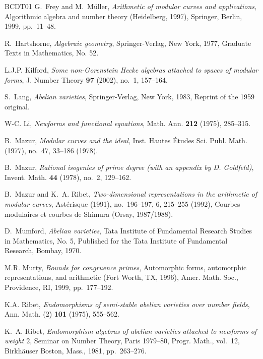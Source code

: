 \documentclass[10pt,twoside]{article}
\theoremstyle{definition}
\begin{document}
\begin{thebibliography}{BCDT01}
G.~Frey and M.~M{\"u}ller, \emph{Arithmetic of modular curves and
  applications}, Algorithmic algebra and number theory (Heidelberg, 1997),
  Springer, Berlin, 1999, pp.~11--48.

R.~Hartshorne, \emph{Algebraic geometry}, Springer-Verlag, New York, 1977,
  Graduate Texts in Mathematics, No. 52. 

L.\thinspace{}J.\thinspace{}P. Kilford, 
  \emph{Some non-{G}orenstein {H}ecke algebras attached to
  spaces of modular forms}, J. Number Theory \textbf{97} (2002), no.~1,
  157--164. 

S.~Lang, \emph{Abelian varieties}, Springer-Verlag, New York, 1983, Reprint
  of the 1959 original. 


W-C. Li, \emph{Newforms and functional equations}, Math. Ann. \textbf{212}
  (1975), 285--315.

B.~Mazur, \emph{Modular curves and the  ideal}, Inst.
  Hautes \'Etudes Sci. Publ. Math. (1977), no.~47, 33--186 (1978).

B.~Mazur, \emph{Rational isogenies of prime degree (with an appendix by {D}.
  {G}oldfeld)}, Invent. Math. \textbf{44} (1978), no.~2, 129--162.

B.~Mazur and K.~A. Ribet, \emph{Two-dimensional representations in the
  arithmetic of modular curves}, Ast\'erisque (1991), no.~196--197, 6, 215--255
  (1992), Courbes modulaires et courbes de Shimura (Orsay, 1987/1988).

D.~Mumford, \emph{Abelian varieties}, Tata Institute of Fundamental Research
  Studies in Mathematics, No. 5, Published for the Tata Institute of
  Fundamental Research, Bombay, 1970. 

M.\thinspace{}R. Murty, \emph{Bounds for congruence primes}, Automorphic forms,
  automorphic representations, and arithmetic (Fort Worth, TX, 1996), Amer.
  Math. Soc., Providence, RI, 1999, pp.~177--192. %

K.\thinspace{}A. Ribet, \emph{Endomorphisms of semi-stable abelian varieties
  over number fields}, Ann. Math. (2) \textbf{101} (1975), 555--562. 

K.~A. Ribet, \emph{Endomorphism algebras of abelian varieties attached to
  newforms of weight {$2$}}, Seminar on Number Theory, Paris 1979--80, Progr.
  Math., vol.~12, Birkh\"auser Boston, Mass., 1981, pp.~263--276.


\end{thebibliography}
\end{document}
